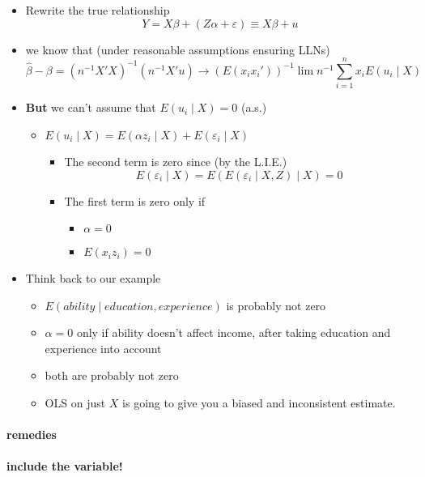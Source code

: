 \begin{itemize}
\item Rewrite the true relationship
         \[ Y = X\beta + (Z\alpha + \varepsilon) \equiv X\beta + u \]
\item we know that (under reasonable assumptions ensuring LLNs)
         \[\hat{\beta} - \beta = (n^{-1} X'X)^{-1}(n^{-1} X'u) \to
         (E(x_{i}x_{i}'))^{-1} \lim n^{-1} \sum_{i=1}^{n} x_{i}
         E(u_{i} \mid X)\]
\item \textbf{But} we can't assume that $E(u_{i}\mid X) = 0$ (a.s.)
\begin{itemize}
\item $E(u_{i} \mid X) = E(\alpha z_{i} \mid X) +
           E(\varepsilon_{i} \mid X)$
\begin{itemize}
\item The second term is zero since (by the
             L.I.E.) \[E(\varepsilon_{i} \mid X) =
             E(E(\varepsilon_{i}\mid X, Z) \mid X) = 0\]
\item The first term is zero only if
\begin{itemize}
\item $\alpha = 0$
\item $E(x_{i} z_{i}) = 0$
\end{itemize}
\end{itemize}
\end{itemize}
\item Think back to our example
\begin{itemize}
\item $E(ability \mid education, experience)$ is probably not zero
\item $\alpha = 0$ only if ability doesn't affect income, after
           taking education and experience into account
\item both are probably not zero
\item OLS on just $X$ is going to give you a biased and
           inconsistent estimate.
\end{itemize}
\end{itemize}
\paragraph{remedies}
\label{sec-2-1-1-2}
\paragraph{include the variable!}
\label{sec-2-1-1-2-1}


